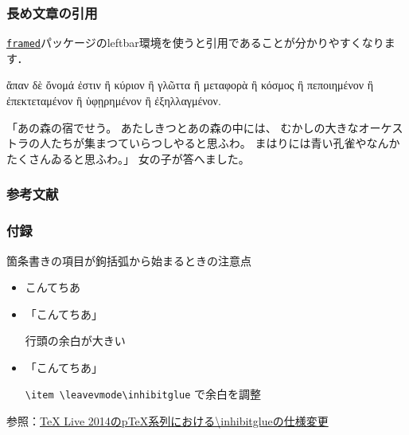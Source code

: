\documentclass[
    12pt,
    unicode]{beamer}
\newenvironment{quoteblock}{%
    \def\FrameCommand{%
        {\color{sLightGray}{\vrule width 3pt}}%
        \hspace{10pt}
    }%
    \MakeFramed {\advance\hsize-\width \FrameRestore}}%
{\endMakeFramed}
\renewcommand\appendixname{付録}
\begin{document}
\begin{frame}
    \frametitle{長め文章の引用}
    \href{https://ctan.org/pkg/framed}{\texttt{framed}}パッケージのleftbar環境を使うと引用であることが分かりやすくなります．

    \begin{quoteblock}
ἅπαν δὲ ὄνομά ἐστιν ἢ κύριον ἢ γλῶττα ἢ μεταφορὰ ἢ κόσμος ἢ πεποιημένον ἢ ἐπεκτεταμένον ἢ ὑφῃρημένον ἢ ἐξηλλαγμένον.

\hfill {}
    \end{quoteblock}

    \begin{quoteblock}
        「あの森の宿でせう。
        あたしきつとあの森の中には、
        むかしの大きなオーケストラの人たちが集まつていらつしやると思ふわ。
        まはりには青い孔雀やなんかたくさんゐると思ふわ。」
        女の子が答へました。

        \hfill {}
    \end{quoteblock}
\end{frame}

\begin{frame}
\frametitle{参考文献}
\footnotesize


\end{frame}

\appendix
\begin{frame}
    \footnotesize
    \frametitle{\appendixname}
    箇条書きの項目が鉤括弧から始まるときの注意点
    \begin{itemize}
        \item こんてちあ
        \item 「こんてちあ」

            行頭の余白が大きい
        \item \leavevmode\inhibitglue 「こんてちあ」

            \texttt{\textbackslash item \textbackslash leavevmode\textbackslash inhibitglue} で余白を調整
    \end{itemize}

    \bigskip

    参照：\href{http://doratex.hatenablog.jp/entry/20140714/1405302796}{TeX Live 2014のpTeX系列における\textbackslash inhibitglueの仕様変更}
\end{frame}
\end{document}
